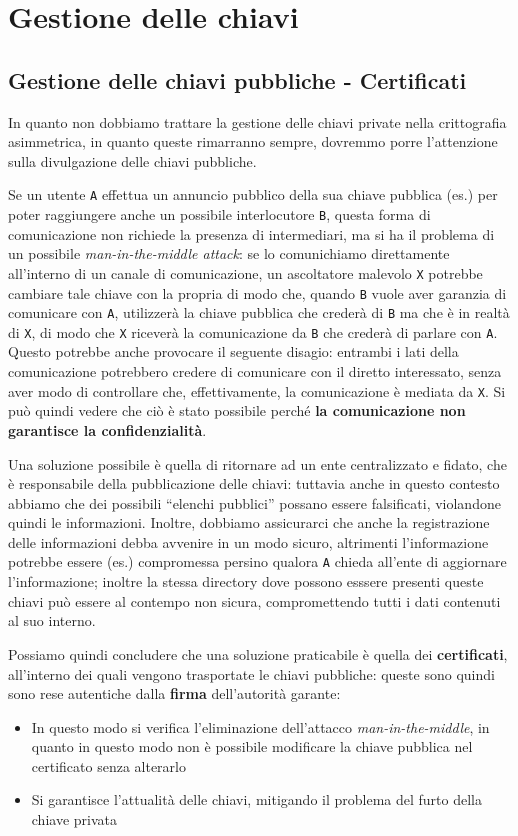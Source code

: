 \chapter{Gestione delle chiavi}
\section{Gestione delle chiavi pubbliche - Certificati}
In quanto non dobbiamo trattare la gestione delle chiavi private nella crittografia
asimmetrica, in quanto queste rimarranno sempre, dovremmo porre l'attenzione
sulla divulgazione delle chiavi pubbliche. 

Se un utente \texttt A effettua un annuncio pubblico della sua chiave pubblica (es.)
per poter raggiungere anche un possibile interlocutore \texttt B, questa
forma di comunicazione non richiede la presenza di intermediari, ma si ha il
problema di un possibile \textit{man-in-the-middle attack}: se lo comunichiamo
direttamente all'interno di un canale di comunicazione, un ascoltatore malevolo \texttt X
potrebbe cambiare tale chiave con la propria di modo che, quando \texttt B vuole
aver garanzia di comunicare con \texttt A, utilizzerà la chiave pubblica che 
crederà di \texttt B ma che è in realtà di \texttt X, di modo che \texttt X riceverà la comunicazione
da \texttt B che crederà di parlare con \texttt A. Questo potrebbe anche provocare il
seguente disagio: entrambi i lati della comunicazione potrebbero credere di 
comunicare con il diretto interessato, senza aver modo di controllare che,
effettivamente, la comunicazione è mediata da \texttt X. Si può quindi vedere che 
ciò è stato possibile perché \textbf{la comunicazione non garantisce la 
confidenzialità}.


Una soluzione possibile è quella di ritornare ad un ente centralizzato e 
fidato, che è responsabile della pubblicazione delle chiavi: tuttavia anche in
questo contesto abbiamo che dei possibili ``elenchi pubblici'' possano essere
falsificati, violandone quindi le informazioni. Inoltre, dobbiamo 
assicurarci che anche la registrazione delle informazioni debba avvenire in un
modo sicuro, altrimenti l'informazione potrebbe essere (es.) compromessa persino
qualora \texttt A chieda all'ente di aggiornare l'informazione; inoltre la stessa
directory dove possono esssere presenti queste chiavi può essere al contempo non
sicura, compromettendo tutti i dati contenuti al suo interno. 

Possiamo quindi concludere che una soluzione praticabile è quella dei \textbf{certificati},
all'interno dei quali vengono trasportate le chiavi pubbliche: queste sono
quindi sono rese autentiche dalla \textbf{firma} dell'autorità garante:
\begin{itemize}
\item In questo modo si verifica l'eliminazione dell'attacco \textit{man-in-the-middle},
	in quanto in questo modo non è possibile modificare la chiave pubblica
	nel certificato senza alterarlo
\item Si garantisce l'attualità delle chiavi, mitigando il problema del furto della
	chiave privata
\end{itemize}
\bigskip

